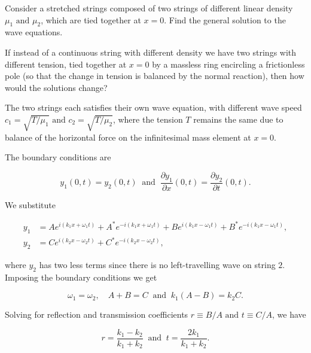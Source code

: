 \documentclass[a4paper,12pt]{report}
\begin{document}
{Consider a stretched strings composed of two strings  of different linear density \(\mu _1 \text { and } \mu _2  \), which are tied together at \(x=0\). Find the general solution to the wave equations.

If instead of a continuous string with different density we have two strings with different tension, tied together at \(x=0\) by a massless ring encircling a frictionless pole (so that the change in tension is balanced by the normal reaction), then how would the solutions change? }
{The two strings each satisfies their own wave equation, with different wave speed \(c_1 = \sqrt{T/\mu _1 } \text { and } c_2 = \sqrt{T/\mu _2 }\), where the tension \(T\) remains the same due to balance of the horizontal force on the infinitesimal mass element at \(x=0\).

The boundary conditions are 

\begin{equation}
	y_1(0,t) = y_2(0,t) ~\text { and }~ \frac{\partial y_1 }{\partial x}(0,t) = \frac{\partial y_2 }{\partial t}(0,t).    
\end{equation}

We substitute 

\begin{equation}
	\begin{aligned} 
	y_1  &= A e^{i (k_1 x+\omega_1  t)} + A^* e^{-i (k_1 x+\omega _1 t)} + B e^{i (k_1 x-\omega _1 t)} + B^* e^{-i (k_1 x-\omega _1 t)}, \\
	y_2 &= C e^{i (k_2 x-\omega _2 t)} + C^* e^{-i (k_2 x - \omega_2t )},  
	\end{aligned} 
\end{equation}

where \(y_2 \) has two less terms since there is no left-travelling wave on string \(2\). Imposing the boundary conditions we get 

\begin{equation}
	\omega _1 = \omega _2, \quad A+B=C ~\text { and }~ k_1(A-B) = k_2C.
\end{equation}

Solving for reflection and transmission coefficients \(r \equiv B /A \text { and } t \equiv C /A\), we have 

\begin{equation}
	r = \frac{k_1 - k_2 }{k_1 + k_2 } ~\text { and }~ t = \frac{2 k_1 }{k_1 + k_2 }.  
\end{equation}



}
\end{document}
